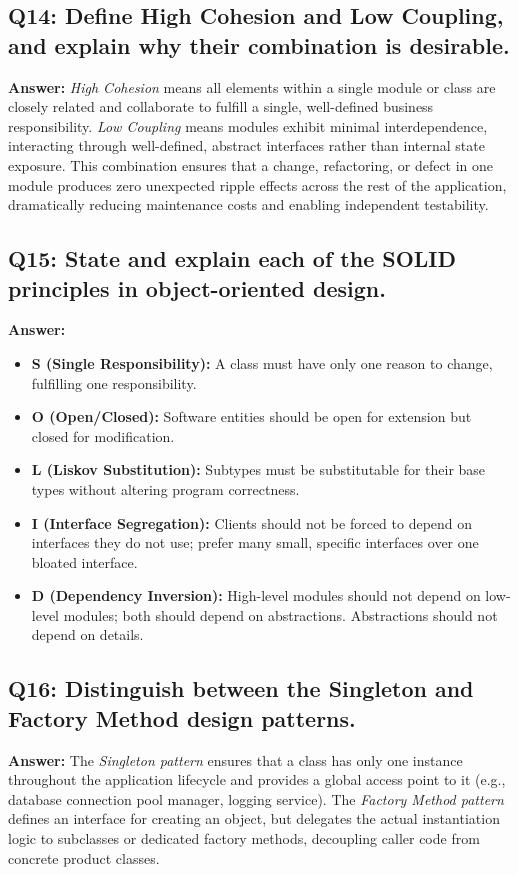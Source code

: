 \subsection*{Q14: Define High Cohesion and Low Coupling, and explain why their combination is desirable.}
\textbf{Answer:} \textit{High Cohesion} means all elements within a single module or class are closely related and collaborate to fulfill a single, well-defined business responsibility. \textit{Low Coupling} means modules exhibit minimal interdependence, interacting through well-defined, abstract interfaces rather than internal state exposure. This combination ensures that a change, refactoring, or defect in one module produces zero unexpected ripple effects across the rest of the application, dramatically reducing maintenance costs and enabling independent testability.

\subsection*{Q15: State and explain each of the SOLID principles in object-oriented design.}
\textbf{Answer:}
\begin{itemize}
    \item \textbf{S (Single Responsibility):} A class must have only one reason to change, fulfilling one responsibility.
    \item \textbf{O (Open/Closed):} Software entities should be open for extension but closed for modification.
    \item \textbf{L (Liskov Substitution):} Subtypes must be substitutable for their base types without altering program correctness.
    \item \textbf{I (Interface Segregation):} Clients should not be forced to depend on interfaces they do not use; prefer many small, specific interfaces over one bloated interface.
    \item \textbf{D (Dependency Inversion):} High-level modules should not depend on low-level modules; both should depend on abstractions. Abstractions should not depend on details.
\end{itemize}

\subsection*{Q16: Distinguish between the Singleton and Factory Method design patterns.}
\textbf{Answer:} The \textit{Singleton pattern} ensures that a class has only one instance throughout the application lifecycle and provides a global access point to it (e.g., database connection pool manager, logging service). The \textit{Factory Method pattern} defines an interface for creating an object, but delegates the actual instantiation logic to subclasses or dedicated factory methods, decoupling caller code from concrete product classes.

